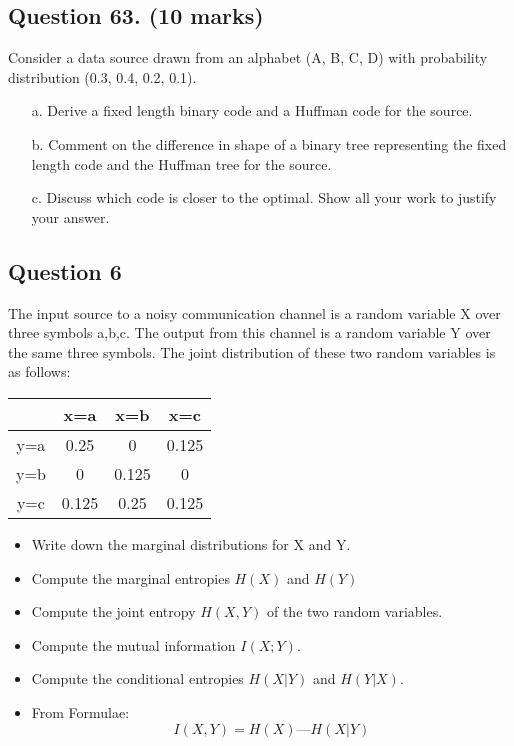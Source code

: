 \documentclass[a4paper,12pt]{article}
\begin{document}
\subsection*{Question 63. (10 marks) } Consider a data source drawn from an alphabet (A, B, C, D) with probability
distribution (0.3, 0.4, 0.2, 0.1).
\begin{itemize}
	\item[a.] Derive a fixed length binary code and a Huffman code for the source.
	\item[b.] Comment on the difference in shape of a binary tree representing the fixed
	length code and the Huffman tree for the source.
	\item[c.] Discuss which code is closer to the optimal. Show all your work to justify your
	answer.
\end{itemize}



\subsection*{Question 6}

The input source to a noisy communication channel is a random variable X over three symbols a,b,c. The output from this channel is a random variable Y over the same three symbols. The joint distribution of these two random variables is as follows:


\begin{center}
\begin{tabular}{|c|c|c|c|}
\hline	 &x=a	&x=b&	     x=c\\ \hline
y=a	 &0.25	&0	 &    0.125 \\ \hline
y=b	 &0	    &0.125&	 0 \\ \hline
y=c	 &0.125&	0.25&	 0.125 \\ \hline
\end{tabular} 
\end{center}

\begin{itemize}
\item Write down the marginal distributions for X and Y. %
\item Compute the marginal entropies $H(X)$ and $H(Y)$ %
\item Compute the joint entropy $H(X,Y)$ of the two random variables. %
\item
Compute the mutual information $I(X;Y)$.
\item 
Compute the conditional entropies $H(X|Y)$ and $H(Y|X)$.
\item 
From Formulae: \[I(X,Y) = H(X) — H(X|Y)\]
\end{itemize}
\end{document}
